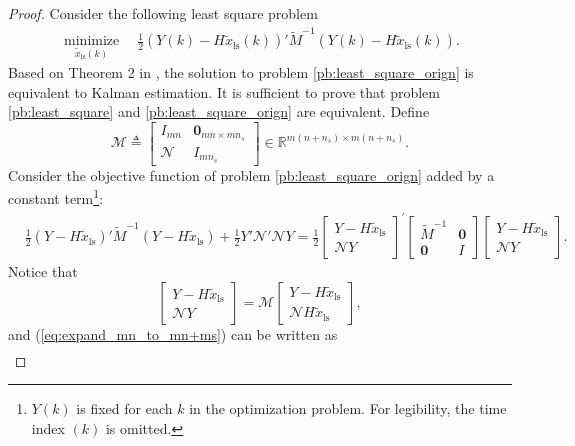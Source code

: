 \documentclass[12pt]{article}  %
\newcommand{\Rb}{{\mathbb{R}}}
\newcommand{\Mc}{{\mathcal{M}}}
\newcommand{\Nc}{{\mathcal{N}}}
\newcommand{\ls}{\text{ls}}
\newtheorem*{proof}{\textbf{Proof}}
\begin{document}
\begin{proof}
	Consider the following least square problem
	\begin{align}\label{pb:least_square_orign}
	\underset{\tilde{x}_\ls (k)}{\operatorname{minimize}}\quad \frac{1}{2} \left({Y}(k)-H \tilde{x}_\ls(k)\right){'} \tilde{M}^{-1} \left({Y}(k)-H \tilde{x}_\ls(k)\right) . 
	\end{align}
	Based on Theorem 2 in \cite{liuxinghua-TAC2020}, the solution to problem \eqref{pb:least_square_orign} is equivalent to Kalman estimation. It is sufficient to prove that problem \eqref{pb:least_square} and \eqref{pb:least_square_orign} are equivalent.
	Define 
	$$
	\Mc\triangleq
	\begin{bmatrix}
	I_{mn} & \mathbf{0}_{mn\times mn_s} \\ 
	\Nc		
	& I_{mn_s} 
	\end{bmatrix}
	\in \Rb^{m(n+n_s)\times m(n+n_s) }.
	$$
	Consider the objective function of problem \eqref{pb:least_square_orign} added by a constant term\footnote{$Y(k)$ is fixed for each $k$ in the optimization problem. For legibility, the time index $(k)$ is omitted.}:
	\begin{align}
	&\frac{1}{2} ({Y} - H\tilde{x}_{\ls} ){'} \tilde{M}^{-1} ({Y} - H\tilde{x}_{\ls} ) +\frac{1}{2}  Y'\Nc'\Nc Y =\frac{1}{2}\begin{bmatrix}
	{Y} - H\tilde{x}_{\ls} \\ \Nc Y
	\end{bmatrix}^{'}
	\begin{bmatrix}
	\tilde{M}^{-1} & \mathbf{0} \\
	\mathbf{0} &  I
	\end{bmatrix}
	\begin{bmatrix}
	{Y} - H\tilde{x}_{\ls} \\ \Nc Y
	\end{bmatrix}. \label{eq:expand_mn_to_mn+ms}
	\end{align}
	Notice that 
	\begin{equation*}
	\begin{bmatrix}
	{Y} - H\tilde{x}_{\ls} \\
	\Nc Y
	\end{bmatrix}=\Mc
	\begin{bmatrix}
	{Y} - H\tilde{x}_{\ls} \\
	\Nc H \tilde{x}_{\ls}
	\end{bmatrix},
	\end{equation*}
	and (\ref{eq:expand_mn_to_mn+ms}) can be written as 
	\begin{align}\label{eq:obj_function}

\end{align}
\end{proof}
\end{document}
